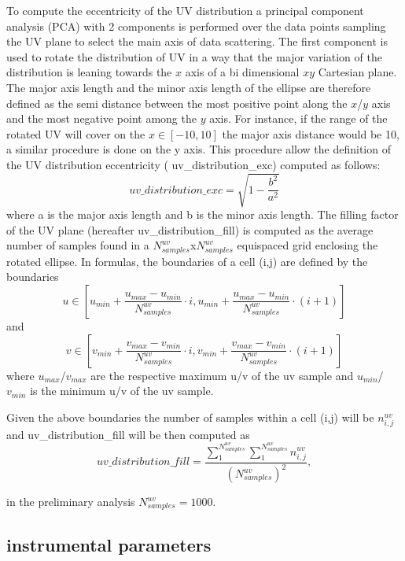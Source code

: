 \documentclass[11pt,a4paper]{ivoa}
\begin{document}
To compute the eccentricity of the UV distribution a principal component analysis (PCA) with 2 components is performed over the data points sampling the UV plane to select the main axis of data scattering. The first component is used to rotate the distribution of UV in a way that the major variation of the distribution is leaning towards the $x$ axis of a bi dimensional $xy$ Cartesian plane. The major axis length and the minor axis length of the ellipse are therefore defined as the semi distance between the most positive point along the $x$/$y$ axis and the most negative point among the $y$ axis. For instance, if the range of the rotated UV will cover on the $x \in [-10, 10]$ the major axis distance would be 10, a similar procedure is done on the y axis. This procedure allow the definition of the UV distribution eccentricity (
uv\_distribution\_exc) computed as follows:
\begin{equation}
uv\_distribution\_exc = \sqrt{1-\frac{b^2}{a^2}}
\end{equation}
where a is the major axis length and b is the minor axis length.
The filling factor of the UV plane (hereafter uv\_distribution\_fill) is computed as the average number of samples found in a $N^{uv}_{samples}$x$N^{uv}_{samples}$ equispaced grid enclosing the rotated ellipse. In formulas,
 the boundaries of a cell (i,j) are defined by the boundaries
\begin{equation}
u \in [u_{min} + \frac{u_{max} - u_{min}}{N^{uv}_{samples}} \cdot i , u_{min} + \frac{u_{max} - u_{min}}{N^{uv}_{samples}} \cdot (i + 1)]
\end{equation} 
and
\begin{equation}
v \in [v_{min} + \frac{v_{max} - v_{min}}{N^{uv}_{samples}} \cdot i , v_{min} + \frac{v_{max} - v_{min}}{N^{uv}_{samples}} \cdot (i + 1)]
\end{equation} 
where $u_{max}$/$v_{max}$ are the respective maximum u/v of the uv sample and $u_{min}$/$v_{min}$ is the minimum u/v of the uv sample.

Given the above boundaries the number of samples within a cell (i,j) will be $n^{uv}_{i,j}$ and uv\_distribution\_fill will be then computed as 
\begin{equation}
uv\_distribution\_fill = \frac{\sum^{N^{uv}_{samples}}_1 \sum^{N^{uv}_{samples}}_{1} n^{uv}_{i,j} }{(N^{uv}_{samples}) ^ 2},
\end{equation}

in the preliminary analysis $N^{uv}_{samples} = 1000$.

\subsection{instrumental parameters}
\end{document}
